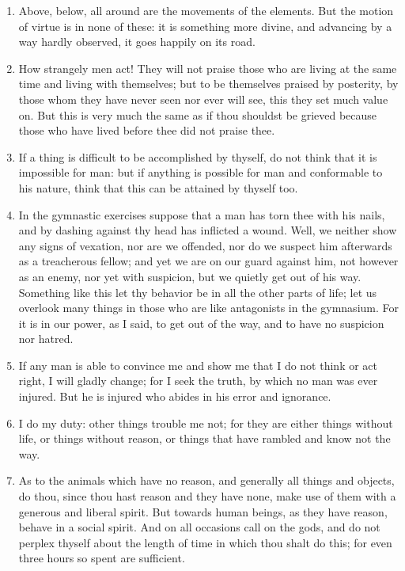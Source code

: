 \begin{enumerate}
\item Above, below, all around are the movements of the elements. But the motion of virtue is in none of these: it is something more divine, and advancing by a way hardly observed, it goes happily on its road.

\item How strangely men act! They will not praise those who are living at the same time and living with themselves; but to be themselves praised by posterity, by those whom they have never seen nor ever will see, this they set much value on. But this is very much the same as if thou shouldst be grieved because those who have lived before thee did not praise thee.

\item If a thing is difficult to be accomplished by thyself, do not think that it is impossible for man: but if anything is possible for man and conformable to his nature, think that this can be attained by thyself too.

\item In the gymnastic exercises suppose that a man has torn thee with his nails, and by dashing against thy head has inflicted a wound. Well, we neither show any signs of vexation, nor are we offended, nor do we suspect him afterwards as a treacherous fellow; and yet we are on our guard against him, not however as an enemy, nor yet with suspicion, but we quietly get out of his way. Something like this let thy behavior be in all the other parts of life; let us overlook many things in those who are like antagonists in the gymnasium. For it is in our power, as I said, to get out of the way, and to have no suspicion nor hatred.

\item If any man is able to convince me and show me that I do not think or act right, I will gladly change; for I seek the truth, by which no man was ever injured. But he is injured who abides in his error and ignorance.

\item I do my duty: other things trouble me not; for they are either things without life, or things without reason, or things that have rambled and know not the way.

\item As to the animals which have no reason, and generally all things and objects, do thou, since thou hast reason and they have none, make use of them with a generous and liberal spirit. But towards human beings, as they have reason, behave in a social spirit. And on all occasions call on the gods, and do not perplex thyself about the length of time in which thou shalt do this; for even three hours so spent are sufficient.


\end{enumerate}
